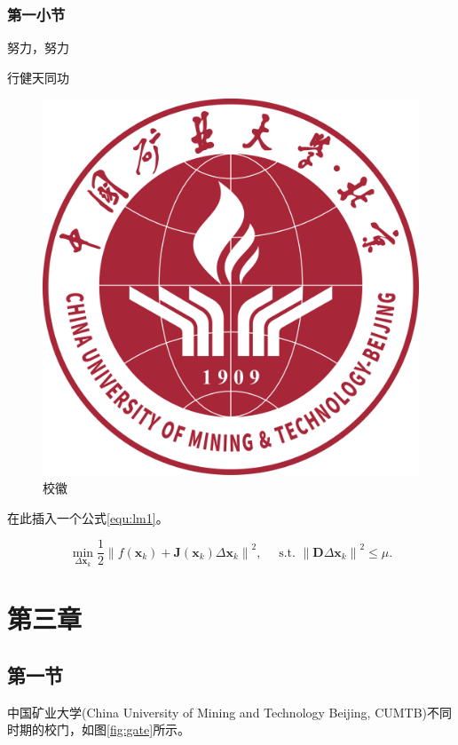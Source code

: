 \documentclass[UTF8,AutoFakeBold=1.3,fixskip = true]{ctexart}
\numberwithin{figure}{section}
\numberwithin{table}{section}
\numberwithin{equation}{section}
\begin{document}
		\subsubsection{第一小节}
		\par 努力，努力
		\par 行健天同功
			\begin{figure}[htbp]
				\centering
				\includegraphics[width=0.3\linewidth]{../pic/badge.png}
				\caption{校徽}
				\label{fig:badge2}
			\end{figure}
		\par 在此插入一个公式\ref{equ:lm1}。
		
		\begin{equation}
			\min _{\Delta \boldsymbol{x}_{k}} \frac{1}{2}\left\|f\left(\boldsymbol{x}_{k}\right)+\boldsymbol{J}\left(\boldsymbol{x}_{k}\right) \Delta \boldsymbol{x}_{k}\right\|^{2}, \quad \text { s.t. }\left\|\boldsymbol{D} \Delta \boldsymbol{x}_{k}\right\|^{2} \leq \mu .
				\label{equ:lm1}
		\end{equation}

\newpage
\section{第三章}
	\subsection{第一节}	
		中国矿业大学(China University of Mining and Technology Beijing, CUMTB)\cite{cumtb1909}不同时期的校门，如图\ref{fig:gate}所示。
\end{document}
